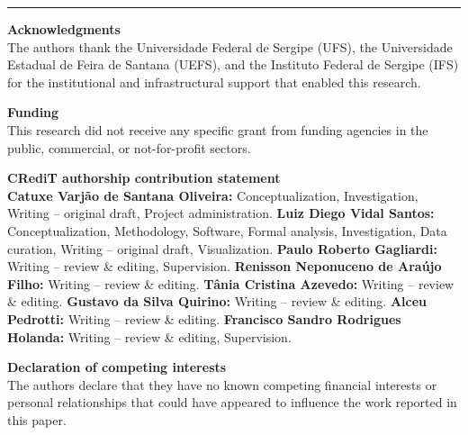 \documentclass[12pt]{article}
\begin{document}
\vspace{24pt}
\hrule
\vspace{12pt}

\noindent\textbf{Acknowledgments}\\[4pt]
The authors thank the Universidade Federal de Sergipe (UFS), the Universidade Estadual de Feira de Santana (UEFS), and the Instituto Federal de Sergipe (IFS) for the institutional and infrastructural support that enabled this research.

\vspace{12pt}

\noindent\textbf{Funding}\\[4pt]
This research did not receive any specific grant from funding agencies in the public, commercial, or not-for-profit sectors.

\vspace{12pt}

\noindent\textbf{CRediT authorship contribution statement}\\[4pt]
\textbf{Catuxe Varjão de Santana Oliveira:} Conceptualization, Investigation, Writing -- original draft, Project administration.
\textbf{Luiz Diego Vidal Santos:} Conceptualization, Methodology, Software, Formal analysis, Investigation, Data curation, Writing -- original draft, Visualization.
\textbf{Paulo Roberto Gagliardi:} Writing -- review \& editing, Supervision.
\textbf{Renisson Neponuceno de Araújo Filho:} Writing -- review \& editing.
\textbf{Tânia Cristina Azevedo:} Writing -- review \& editing.
\textbf{Gustavo da Silva Quirino:} Writing -- review \& editing.
\textbf{Alceu Pedrotti:} Writing -- review \& editing.
\textbf{Francisco Sandro Rodrigues Holanda:} Writing -- review \& editing, Supervision.

\vspace{12pt}

\noindent\textbf{Declaration of competing interests}\\[4pt]
The authors declare that they have no known competing financial interests or personal relationships that could have appeared to influence the work reported in this paper.
\end{document}
